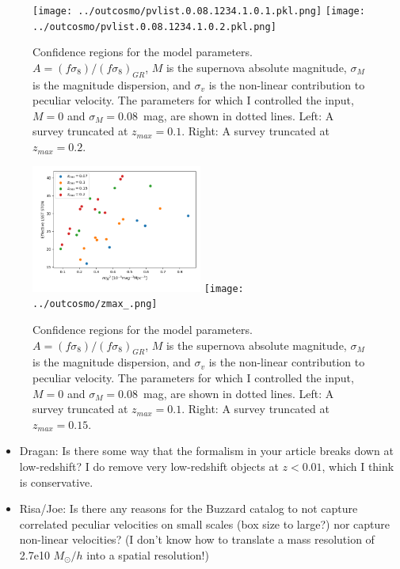 \documentclass{aastex62}   	%
\begin{document}
\begin{figure}
\texttt{[image: ../outcosmo/pvlist.0.08.1234.1.0.1.pkl.png]}
\texttt{[image: ../outcosmo/pvlist.0.08.1234.1.0.2.pkl.png]}
\caption{Confidence regions for the model parameters.  $A=(f\sigma_8)/(f\sigma_8)_{GR}$, $M$ is the supernova
absolute magnitude, $\sigma_M$ is the magnitude dispersion, and $\sigma_v$ is the non-linear contribution
to peculiar velocity.   The parameters for which I controlled the input, $M=0$ and $\sigma_M=0.08$~mag, are shown in dotted lines.
 Left: A survey truncated at $z_{max}=0.1$.  Right: A survey truncated at $z_{max}=0.2$.
\label{zmax:fig}}
\end{figure}

\begin{figure}
\includegraphics[width=0.5\textwidth]{../outcosmo/fracsnsig2_.png}
\texttt{[image: ../outcosmo/zmax\_.png]}
\caption{Confidence regions for the model parameters.  $A=(f\sigma_8)/(f\sigma_8)_{GR}$, $M$ is the supernova
absolute magnitude, $\sigma_M$ is the magnitude dispersion, and $\sigma_v$ is the non-linear contribution
to peculiar velocity.   The parameters for which I controlled the input, $M=0$ and $\sigma_M=0.08$~mag, are shown in dotted lines.
 Left: A survey truncated at $z_{max}=0.1$.  Right: A survey truncated at $z_{max}=0.15$.
\label{zmax:fig}}
\end{figure}

\begin{itemize}
\item Dragan: Is there some way that the formalism in your article breaks down at low-redshift?  I do remove very low-redshift objects at $z<0.01$,
which I think is conservative.
 \item Risa/Joe: Is there any reasons for the Buzzard catalog to not capture correlated peculiar velocities on small scales (box size to large?) nor capture
 non-linear velocities?  (I don't know how to translate a mass resolution of 2.7e10 $M_{\odot}/h$ into a spatial resolution!)
\end{itemize}



\end{document}
